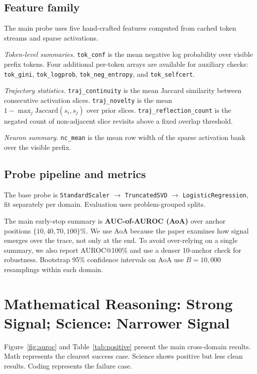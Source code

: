 \documentclass[10pt,twocolumn]{article}
\begin{document}
\subsection{Feature family}

The main probe uses five hand-crafted features computed from cached token streams and sparse activations.

\textit{Token-level summaries.}
\texttt{tok\_conf} is the mean negative log probability over visible prefix tokens. Four additional per-token arrays are available for auxiliary checks: \texttt{tok\_gini}, \texttt{tok\_logprob}, \texttt{tok\_neg\_entropy}, and \texttt{tok\_selfcert}.

\textit{Trajectory statistics.}
\texttt{traj\_continuity} is the mean Jaccard similarity between consecutive activation slices.
\texttt{traj\_novelty} is the mean $1 - \max_j \text{Jaccard}(s_i, s_j)$ over prior slices.
\texttt{traj\_reflection\_count} is the negated count of non-adjacent slice revisits above a fixed overlap threshold.

\textit{Neuron summary.}
\texttt{nc\_mean} is the mean row width of the sparse activation bank over the visible prefix.

\subsection{Probe pipeline and metrics}

The base probe is \texttt{StandardScaler} $\rightarrow$ \texttt{TruncatedSVD} $\rightarrow$ \texttt{LogisticRegression}, fit separately per domain. Evaluation uses problem-grouped splits.

The main early-stop summary is \textbf{AUC-of-AUROC (AoA)} over anchor positions $\{10,40,70,100\}$\%. We use AoA because the paper examines how signal emerges over the trace, not only at the end. To avoid over-relying on a single summary, we also report AUROC@100\% and use a denser 10-anchor check for robustness. Bootstrap 95\% confidence intervals on AoA use $B=10{,}000$ resamplings within each domain.

\section{Mathematical Reasoning: Strong Signal; Science: Narrower Signal}
\label{sec:positive}

Figure~\ref{fig:auroc} and Table~\ref{tab:positive} present the main cross-domain results. Math represents the clearest success case. Science shows positive but less clean results. Coding represents the failure case.
\end{document}
